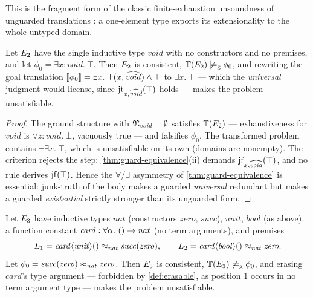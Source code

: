 This is the fragment form of the classic finite-exhaustion unsoundness of
unguarded translations \cite{MengPaulson2008,CzajkaKaliszyk2018}: a
one-element type exports its extensionality to the whole untyped domain.

\begin{proposition}
  \label{prop:tight-exists}
  Let $E_2$ have the single inductive type $\mathit{void}$ with no
  constructors and no premises, and let
  $\phi_0 = \exists x{:}\mathit{void}.\ \top$.  Then $E_2$ is
  consistent, $\mathbb{T}(E_2) \not\models_{\mathrm{g}} \phi_0$, and rewriting the goal
  translation $[\![ \phi_0 ]\!] = \exists x.\ \mathsf{T}(x,\widehat{\mathit{void}})
  \wedge \top$ to $\exists x.\ \top$ --- which the \emph{universal}
  judgment would license, since $\mathrm{jt}_{x,\widehat{\mathit{void}}}(\top)$
  holds --- makes the problem unsatisfiable.
\end{proposition}

\begin{proof}
  The ground structure with $\mathfrak{N}_{\mathit{void}} = \emptyset$ satisfies
  $\mathbb{T}(E_2)$ --- exhaustiveness for $\mathit{void}$ is
  $\forall z{:}\mathit{void}.\ \bot$, vacuously true --- and falsifies
  $\phi_0$.  The transformed problem contains
  $\neg \exists x.\ \top$, which is unsatisfiable on its own (domains are
  nonempty).  The criterion rejects the step:
  \cref{thm:guard-equivalence}(ii) demands
  $\mathrm{jf}_{x,\widehat{\mathit{void}}}(\top)$, and no rule derives
  $\mathrm{jf}(\top)$.  Hence the $\forall$/$\exists$ asymmetry of
  \cref{thm:guard-equivalence} is essential: junk-truth of the body makes
  a guarded \emph{universal} redundant but makes a guarded
  \emph{existential} strictly stronger than its unguarded form.
\end{proof}

\begin{proposition}
  \label{prop:tight-nil}
  Let $E_3$ have inductive types $\mathit{nat}$ (constructors
  $\mathit{zero}$, $\mathit{succ}$), $\mathit{unit}$, $\mathit{bool}$
  (as above), a function constant
  $\mathit{card} : \forall\alpha.\ () \rightarrow \mathit{nat}$ (no term
  arguments), and premises
  \[
    L_1 = \mathit{card}\langle\mathit{unit}\rangle()
          \approx_{\mathit{nat}} \mathit{succ}(\mathit{zero}),
    \qquad
    L_2 = \mathit{card}\langle\mathit{bool}\rangle()
          \approx_{\mathit{nat}} \mathit{zero} .
  \]
  Let $\phi_0 = \mathit{succ}(\mathit{zero}) \approx_{\mathit{nat}}
  \mathit{zero}$.  Then $E_3$ is consistent,
  $\mathbb{T}(E_3) \not\models_{\mathrm{g}} \phi_0$, and erasing $\mathit{card}$'s type
  argument
  --- forbidden by \cref{def:erasable}, as position $1$ occurs in no term
  argument type --- makes the problem unsatisfiable.
\end{proposition}

